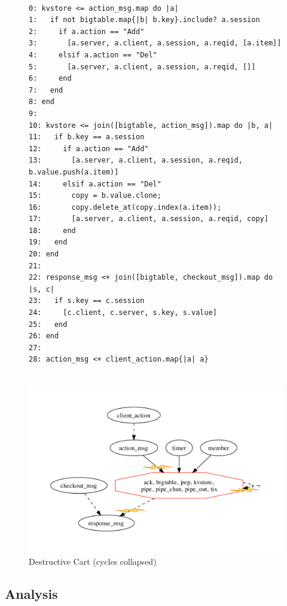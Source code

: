 \begin{figure}[t]
\begin{scriptsize}
\begin{verbatim}

0: kvstore <= action_msg.map do |a|
1:   if not bigtable.map{|b| b.key}.include? a.session
2:     if a.action == "Add"
3:       [a.server, a.client, a.session, a.reqid, [a.item]]
4:     elsif a.action == "Del"
5:       [a.server, a.client, a.session, a.reqid, []]
6:     end
7:   end
8: end
9: 
10: kvstore <= join([bigtable, action_msg]).map do |b, a|
11:   if b.key == a.session
12:     if a.action == "Add"
13:       [a.server, a.client, a.session, a.reqid, b.value.push(a.item)]
14:     elsif a.action == "Del"
15:       copy = b.value.clone;
16:       copy.delete_at(copy.index(a.item));
17:       [a.server, a.client, a.session, a.reqid, copy]
18:     end
19:   end
20: end
21:
22: response_msg <+ join([bigtable, checkout_msg]).map do |s, c|
23:   if s.key == c.session
24:     [c.client, c.server, s.key, s.value]
25:   end
26: end
27: 
28: action_msg <+ client_action.map{|a| a}


\end{verbatim}
\end{scriptsize}
\centering
\includegraphics[width=0.9\linewidth]{fig/destructive.pdf}

\caption{Destructive Cart (cycles collapsed)}
\label{fig:pdg-destructive}
\end{figure}


\subsection{Analysis}


